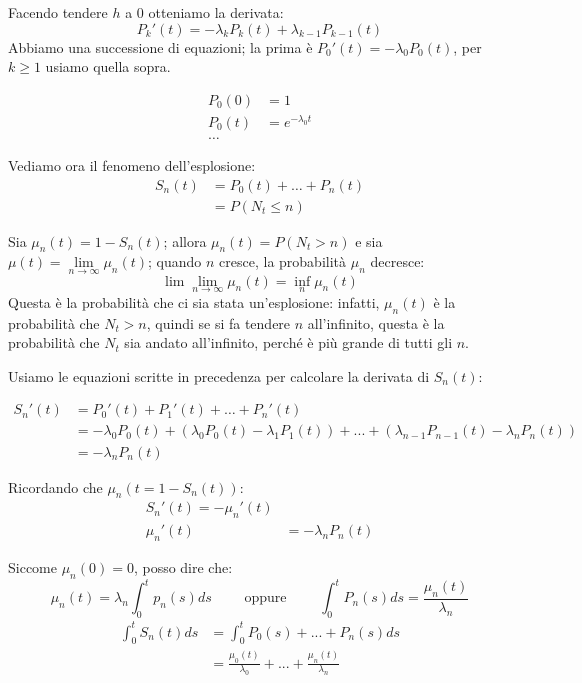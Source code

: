 \documentclass[a4paper,12pt]{book}
\begin{document}
Facendo tendere $ h $ a 0 otteniamo la derivata:
$$ P_k'(t) = -\lambda_k P_k( t) + \lambda_{k-1} P_{k-1}(t)$$ 
Abbiamo una successione di equazioni; la prima è $P_0'(t) = -\lambda_0P_0(t)$, per $ k \ge 1 $ usiamo quella sopra. 

\begin{align*}
	P_0(0) & = 1 \\
	P_0(t) & = e^{-\lambda_0 t} \\
	\dots &
\end{align*}

Vediamo ora il fenomeno dell'esplosione:
\begin{align*}
	S_n(t) & = P_0(t) + \dots + P_n(t) \\
	& =  P(N_t \le n)	
\end{align*}

Sia $ \mu_n(t) = 1 - S_n(t) $; allora $ \mu_n(t) = P(N_t > n) $ e sia $\mu(t) = \lim\limits_{n \to \infty} \mu_n(t)$; quando $ n $ cresce, la probabilità $\mu_n$ decresce:
$$ \lim\lim\limits_{n \to \infty} \mu_n(t) = \underset{n}{\inf} \mu_n(t) $$
Questa è la probabilità che ci sia stata un'esplosione: infatti, $ \mu_n(t) $ è la probabilità che $ N_t > n $, quindi se si fa tendere $ n $ all'infinito, questa è la probabilità che $ N_t $ sia andato all'infinito, perché è più grande di tutti gli $ n $.

Usiamo le equazioni scritte in precedenza per calcolare la derivata di $ S_n(t) $:

\begin{align*}
	S_n'(t) & = P_0'(t) + P_1'(t) + \dots + P_n'(t) \\ 
	& = -\lambda_0P_0(t) + (\lambda_0P_0(t) - \lambda_1P_1(t)) + ... + (\lambda_{n-1}P_{n-1}(t) - \lambda_n P_n(t)) \\
	& = -\lambda_nP_n(t)
\end{align*}

Ricordando che $ \mu_n(t = 1 - S_n(t)) $:
\begin{align*}
	S_n'(t) = - \mu_n' (t) \\
	\mu_n'(t) & = -\lambda_nP_n(t)
\end{align*}

Siccome $\mu_n(0) = 0$, posso dire che:
$$ \mu_n(t) = \lambda_n \int_{0}^{t}p_n(s) ds \qquad \text{ oppure } \qquad \int_{0}^{t}P_n(s)ds = \frac{\mu_n(t)}{\lambda_n} $$
\begin{align*}
	\int_{0}^{t} S_n(t)ds  & = \int_{0}^{t}P_0(s) + ... + P_n(s) ds \\
	& = \frac{\mu_0(t)}{\lambda_0} + ... + \frac{\mu_n(t)}{\lambda_n}
\end{align*}
\end{document}
